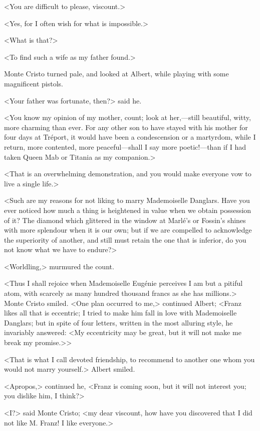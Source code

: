  <You are difficult to please, viscount.> 

 <Yes, for I often wish for what is impossible.> 

 <What is that?> 

 <To find such a wife as my father found.> 

 Monte Cristo turned pale, and looked at Albert, while playing with some magnificent pistols. 

 <Your father was fortunate, then?> said he. 

 <You know my opinion of my mother, count; look at her,—still beautiful, witty, more charming than ever. For any other son to have stayed with his mother for four days at Tréport, it would have been a condescension or a martyrdom, while I return, more contented, more peaceful—shall I say more poetic!—than if I had taken Queen Mab or Titania as my companion.>

<That is an overwhelming demonstration, and you would make everyone vow to live a single life.> 

 <Such are my reasons for not liking to marry Mademoiselle Danglars. Have you ever noticed how much a thing is heightened in value when we obtain possession of it? The diamond which glittered in the window at Marlé's or Fossin's shines with more splendour when it is our own; but if we are compelled to acknowledge the superiority of another, and still must retain the one that is inferior, do you not know what we have to endure?> 

 <Worldling,> murmured the count. 

 <Thus I shall rejoice when Mademoiselle Eugénie perceives I am but a pitiful atom, with scarcely as many hundred thousand francs as she has millions.> Monte Cristo smiled. <One plan occurred to me,> continued Albert; <Franz likes all that is eccentric; I tried to make him fall in love with Mademoiselle Danglars; but in spite of four letters, written in the most alluring style, he invariably answered: <My eccentricity may be great, but it will not make me break my promise.>> 

 <That is what I call devoted friendship, to recommend to another one whom you would not marry yourself.> Albert smiled. 

 <Apropos,> continued he, <Franz is coming soon, but it will not interest you; you dislike him, I think?> 

 <I?> said Monte Cristo; <my dear viscount, how have you discovered that I did not like M. Franz! I like everyone.> 

